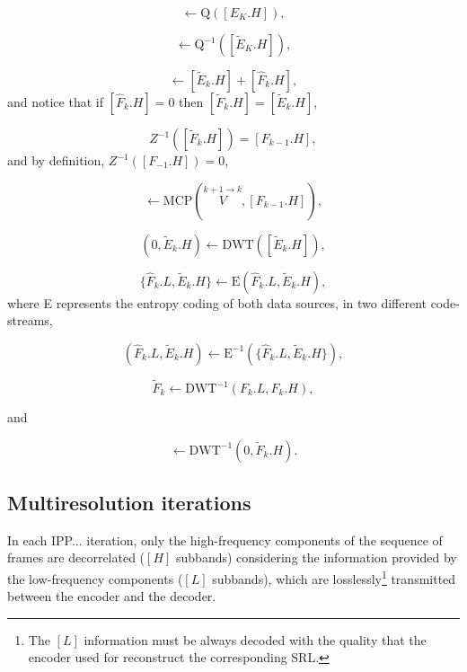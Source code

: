 \begin{equation}
  [\tilde{E}_k.H] \leftarrow \text{Q}([E_K.H]),
  \tag{j}
\end{equation}

\begin{equation}
  [\tilde{E}_k.H] \leftarrow  \text{Q}^{-1}([\tilde{E}_K.H]),
  \tag{k}
\end{equation}

\begin{equation}
  [\tilde{F}_k.H] \leftarrow [\tilde{E}_k.H] + [\hat{F}_k.H],
  \tag{l}
\end{equation}
and notice that if $[\hat{F}_k.H]=0$ then $[\tilde{F}_k.H] =
[\tilde{E}_k.H]$,

\begin{equation}
  Z^{-1}([\tilde{F}_k.H]) = [F_{k-1}.H],
  \tag{m}
\end{equation}
and by definition, $Z^{-1}([F_{-1}.H]) = 0$,

\begin{equation}
  [\hat{F}_k.H] \leftarrow \text{MCP}(\overset{k+1\rightarrow k}{V}, [F_{k-1}.H]),
  \tag{n}
\end{equation}

\begin{equation}
  (0, \tilde{E}_k.H) \leftarrow \text{DWT}([\tilde{E}_k.H]),
  \tag{o}
\end{equation}

\begin{equation}
  \{\hat{F}_k.L, \tilde{E}_k.H\} \leftarrow \text{E}(\hat{F}_k.L, \tilde{E}_k.H),
  \tag{p}
\end{equation}
where E represents the entropy coding of both data sources, in two
different code-streams,

\begin{equation}
  (\hat{F}_k.L, \tilde{E}_k.H) \leftarrow \text{E}^{-1}(\{\hat{F}_k.L, \tilde{E}_k.H\}),
  \tag{q}
\end{equation}

\begin{equation}
  \tilde{F}_k \leftarrow \text{DWT}^{-1}(F_k.L, F_k.H),
  \tag{r}
\end{equation}

and

\begin{equation}
  [\tilde{E}_k.H] \leftarrow \text{DWT}^{-1}(0, \tilde{F}_k.H).
  \tag{s}
\end{equation}

\subsection{Multiresolution iterations}
In each IPP... iteration, only the high-frequency components of the
sequence of frames are decorrelated ($[H]$ subbands) considering the
information provided by the low-frequency components ($[L]$ subbands),
which are losslessly\footnote{The $[L]$ information must be always
decoded with the quality that the encoder used for reconstruct the
corresponding SRL.} transmitted between the encoder and the decoder.

